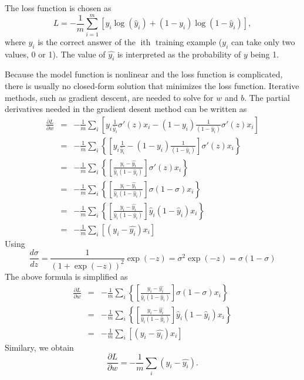 \documentclass{article}
\newcommand{\tmop}[1]{\ensuremath{\operatorname{#1}}}
\begin{document}
The loss function is chosen as
\begin{equation}
  L = - \frac{1}{m} \sum_{i = 1}^m [y_i \log (\hat{y}_i) + (1 - y_i) \log (1 -
  \hat{y}_i)],
\end{equation}
where $y_i$ is the correct answer of the $\tmop{ith}$ training example ($y_i$
can take only two values, 0 or 1). The value of $\widehat{y_i}$ is interpreted
as the probability of $y$ being 1.

Because the model function is nonlinear and the loss function is complicated,
there is usually no closed-form solution that minimizes the loss function.
Iterative methods, such as gradient descent, are needed to solve for $w$ and
$b$. The partial derivatives needed in the gradient desent method can be
written as
\begin{eqnarray}
  \frac{\partial L}{\partial w} & = & - \frac{1}{m} \sum_i \left[ y_i 
  \frac{1}{\hat{y}_i} \sigma' (z) x_i - (1 - y_i) \frac{1}{(1 - \hat{y}_i)}
  \sigma' (z) x_i \right] \nonumber\\
  & = & - \frac{1}{m} \sum_i \left\{ \left[ y_i  \frac{1}{\hat{y}_i} - (1 -
  y_i) \frac{1}{(1 - \hat{y}_i)} \right] \sigma' (z) x_i \right\} \nonumber\\
  & = & - \frac{1}{m} \sum_i \left\{ \left[  \frac{y_i -
  \widehat{y_i}}{\hat{y}_i (1 - \hat{y}_i)} \right] \sigma' (z) x_i \right\}
  \nonumber\\
  & = & - \frac{1}{m} \sum_i \left\{ \left[  \frac{y_i -
  \widehat{y_i}}{\hat{y}_i (1 - \hat{y}_i)} \right] \sigma (1 - \sigma) x_i
  \right\} \nonumber\\
  & = & - \frac{1}{m} \sum_i \left\{ \left[  \frac{y_i -
  \widehat{y_i}}{\hat{y}_i (1 - \hat{y}_i)} \right] \hat{y}_i (1 - \hat{y}_i)
  x_i \right\} \nonumber\\
  & = & - \frac{1}{m} \sum_i [ (y_i - \widehat{y_i}) x_i] 
\end{eqnarray}
Using
\begin{equation}
  \frac{d \sigma}{d z} = \frac{1}{(1 + \exp (- z))^2} \exp (- z) = \sigma^2
  \exp (- z) = \sigma (1 - \sigma)
\end{equation}
The above formula is simplified as
\begin{equation}
  \begin{array}{lll}
    \frac{\partial L}{\partial w} & = & - \frac{1}{m} \sum_i \left\{ \left[ 
    \frac{y_i - \widehat{y_i}}{\hat{y}_i (1 - \hat{y}_i)} \right] \sigma (1 -
    \sigma) x_i \right\}\\
    & = & - \frac{1}{m} \sum_i \left\{ \left[  \frac{y_i -
    \widehat{y_i}}{\hat{y}_i (1 - \hat{y}_i)} \right] \hat{y}_i (1 -
    \hat{y}_i) x_i \right\}\\
    & = & - \frac{1}{m} \sum_i [ (y_i - \widehat{y_i}) x_i]
  \end{array}
\end{equation}
Similary, we obtain
\begin{equation}
  \frac{\partial L}{\partial w} = - \frac{1}{m} \sum_i (y_i - \widehat{y_i}) .
\end{equation}
\end{document}
